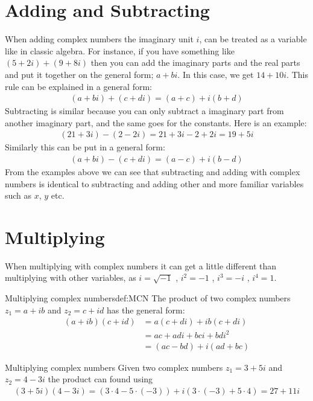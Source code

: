\section{Adding and Subtracting}
When adding complex numbers the imaginary unit $i$, can be treated as a variable like in classic algebra. For instance, if you have something like $(5+2i)+(9+8i)$ then you can add the imaginary parts and the real parts and put it together on the general form; $a+bi$. In this case, we get $14+10i$. This rule can be explained in a general form: 
\begin{align*}
(a + bi) + (c + di) = (a + c) + i(b + d)
\end{align*}
Subtracting is similar because you can only subtract a imaginary part from another imaginary part, and the same goes for the constants. Here is an example:
\begin{align*}
(21 + 3i) - (2 - 2i) = 21 + 3i - 2 + 2i = 19 + 5i
\end{align*}
Similarly this can be put in a general form:
\begin{align*}
(a + bi) - (c + di) = (a - c) + i(b - d)
\end{align*}
From the examples above we can see that subtracting and adding with complex numbers is identical to subtracting and adding other and more familiar variables such as $x$, $y$ etc.

\section{Multiplying}
When multiplying with complex numbers it can get a little different than multiplying with other variables, as $i=\sqrt{-1}$ , $i^2=-1$ , $i^3=-i$ , $i^4=1$. \\
\begin{definition}{Multiplying complex numbers}{def:MCN}
The product of two complex numbers $z_1=a+ib$ and $z_2=c+id$ has the general form:
\begin{align*}
(a+ib)(c+id)&=a(c+di)+ib(c+di)
\\
&=ac+adi+bci+bdi^2
\\
&=(ac-bd)+i(ad+bc)
\end{align*}
\end{definition}
\begin{example}{Multiplying complex numbers}{}
Given two complex numbers $z_1=3+5i$ and $z_2=4-3i$ the product can found using 
\begin{align*}
(3+5i)(4-3i) = (3\cdot4-5\cdot(-3))+i(3\cdot(-3)+5\cdot4)=27+11i
\end{align*}
\end{example}



